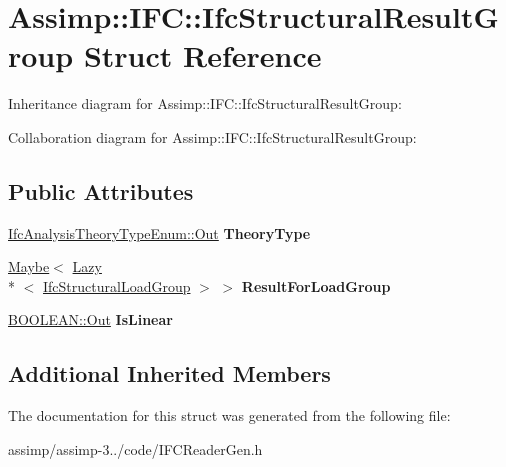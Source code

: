 \hypertarget{struct_assimp_1_1_i_f_c_1_1_ifc_structural_result_group}{\section{Assimp\+:\+:I\+F\+C\+:\+:Ifc\+Structural\+Result\+Group Struct Reference}
\label{struct_assimp_1_1_i_f_c_1_1_ifc_structural_result_group}
}


Inheritance diagram for Assimp\+:\+:I\+F\+C\+:\+:Ifc\+Structural\+Result\+Group\+:


Collaboration diagram for Assimp\+:\+:I\+F\+C\+:\+:Ifc\+Structural\+Result\+Group\+:
\subsection*{Public Attributes}
\begin{DoxyCompactItemize}
\item 
\hypertarget{struct_assimp_1_1_i_f_c_1_1_ifc_structural_result_group_a1eb2a5a808ad7c3d860cb74eb7d81ec4}{\hyperlink{classboost_1_1shared__ptr}{Ifc\+Analysis\+Theory\+Type\+Enum\+::\+Out} {\bfseries Theory\+Type}}\label{struct_assimp_1_1_i_f_c_1_1_ifc_structural_result_group_a1eb2a5a808ad7c3d860cb74eb7d81ec4}

\item 
\hypertarget{struct_assimp_1_1_i_f_c_1_1_ifc_structural_result_group_a7e158841aaa0edcf71e4dede1deb3010}{\hyperlink{struct_assimp_1_1_s_t_e_p_1_1_maybe}{Maybe}$<$ \hyperlink{struct_assimp_1_1_s_t_e_p_1_1_lazy}{Lazy}\\*
$<$ \hyperlink{struct_assimp_1_1_i_f_c_1_1_ifc_structural_load_group}{Ifc\+Structural\+Load\+Group} $>$ $>$ {\bfseries Result\+For\+Load\+Group}}\label{struct_assimp_1_1_i_f_c_1_1_ifc_structural_result_group_a7e158841aaa0edcf71e4dede1deb3010}

\item 
\hypertarget{struct_assimp_1_1_i_f_c_1_1_ifc_structural_result_group_a3776934d120a00698f0dd421c48dffa4}{\hyperlink{classboost_1_1shared__ptr}{B\+O\+O\+L\+E\+A\+N\+::\+Out} {\bfseries Is\+Linear}}\label{struct_assimp_1_1_i_f_c_1_1_ifc_structural_result_group_a3776934d120a00698f0dd421c48dffa4}

\end{DoxyCompactItemize}
\subsection*{Additional Inherited Members}


The documentation for this struct was generated from the following file\+:\begin{DoxyCompactItemize}
\item 
assimp/assimp-\/3../code/I\+F\+C\+Reader\+Gen.\+h\end{DoxyCompactItemize}

